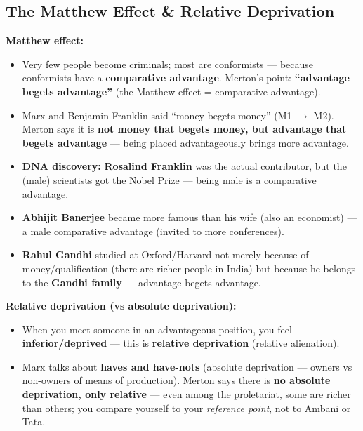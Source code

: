 \sectiondivider

\subsection{The Matthew Effect \& Relative Deprivation}

\begin{KeyConcept}
\textbf{Matthew effect:}
\begin{itemize}
\item Very few people become criminals; most are conformists --- because conformists have a \textbf{comparative advantage}. Merton's point: \textbf{``advantage begets advantage''} (the Matthew effect = comparative advantage).
\item Marx and Benjamin Franklin said ``money begets money'' (M1 $\rightarrow$ M2). Merton says it is \textbf{not money that begets money, but advantage that begets advantage} --- being placed advantageously brings more advantage.
\end{itemize}
\end{KeyConcept}

\begin{ExampleBox}
\begin{itemize}
\item \textbf{DNA discovery:} \textbf{Rosalind Franklin} was the actual contributor, but the (male) scientists got the Nobel Prize --- being male is a comparative advantage.
\item \textbf{Abhijit Banerjee} became more famous than his wife (also an economist) --- a male comparative advantage (invited to more conferences).
\item \textbf{Rahul Gandhi} studied at Oxford/Harvard not merely because of money/qualification (there are richer people in India) but because he belongs to the \textbf{Gandhi family} --- advantage begets advantage.
\end{itemize}
\end{ExampleBox}

\begin{KeyConcept}
\textbf{Relative deprivation (vs absolute deprivation):}
\begin{itemize}
\item When you meet someone in an advantageous position, you feel \textbf{inferior/deprived} --- this is \textbf{relative deprivation} (relative alienation).
\item Marx talks about \textbf{haves and have-nots} (absolute deprivation --- owners vs non-owners of means of production). Merton says there is \textbf{no absolute deprivation, only relative} --- even among the proletariat, some are richer than others; you compare yourself to your \textit{reference point}, not to Ambani or Tata.
\end{itemize}
\end{KeyConcept}

